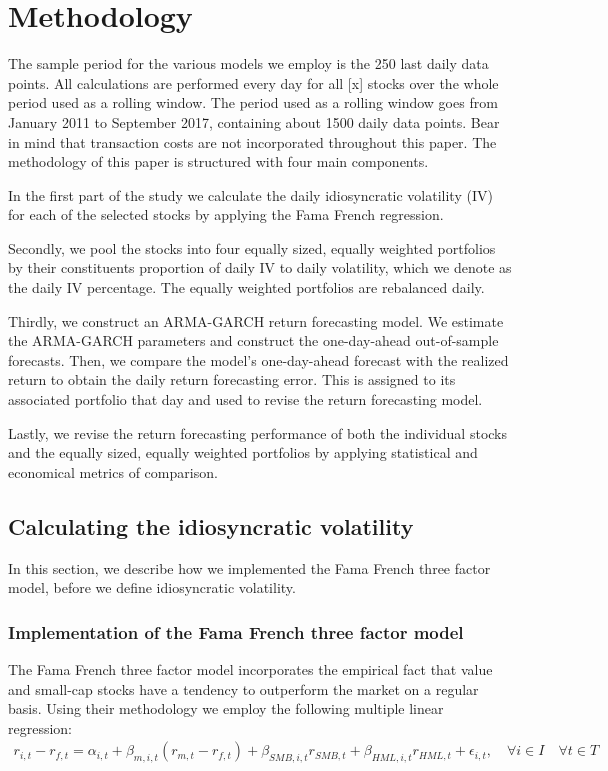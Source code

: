 \chapter{Methodology}
\label{Methodology}

The sample period for the various models we employ is the 250 last daily data points. All calculations are performed every day for all [x] stocks over the whole period used as a rolling window. The period used as a rolling window goes from January 2011 to September 2017, containing about 1500 daily data points. Bear in mind that transaction costs are not incorporated throughout this paper. The methodology of this paper is structured with four main components. 

In the first part of the study we calculate the daily idiosyncratic volatility (IV) for each of the selected stocks by applying the Fama French regression.

Secondly, we pool the stocks into four equally sized, equally weighted portfolios by their constituents proportion of daily IV to daily volatility, which we denote as the daily IV percentage. The equally weighted portfolios are rebalanced daily.

Thirdly, we construct an ARMA-GARCH return forecasting model. We estimate the ARMA-GARCH parameters and construct the one-day-ahead out-of-sample forecasts. Then, we compare the model’s one-day-ahead forecast with the realized return to obtain the daily return forecasting error. This is assigned to its associated portfolio that day and used to revise the return forecasting model. 

Lastly, we revise the return forecasting performance of both the individual stocks and the equally sized, equally weighted portfolios by applying statistical and economical metrics of comparison.

\section{Calculating the idiosyncratic volatility}

In this section, we describe how we implemented the Fama French three factor model, before we define idiosyncratic volatility.

\subsection{Implementation of the Fama French three factor model} The Fama French three factor model \cite{famafrench} incorporates the empirical fact that value and small-cap stocks have a tendency to outperform the market on a regular basis. Using their methodology we employ the following multiple linear regression:
\begin{align} 
    r_{i,t} - r_{f,t}= \alpha_{i,t} + \beta_{m,i,t}(r_{m,t} - r_{f,t}) + \beta_{SMB,i,t}r_{SMB,t} + \beta_{HML,i,t}r_{HML,t} + \epsilon_{i,t}, \quad  \forall i \in I \quad  \forall t \in T 
    \label{FFregression}
\end{align}

